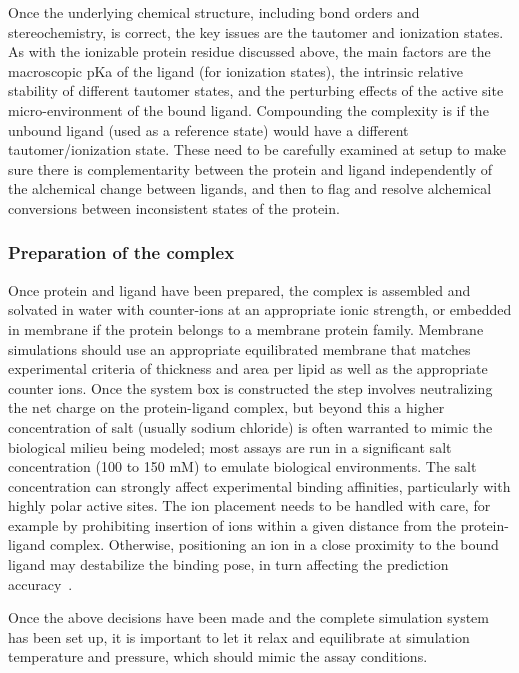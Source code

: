 \documentclass[9pt,bestpractices,pubversion]{livecoms}
\begin{document}
Once the underlying chemical structure, including bond orders and stereochemistry, is correct, the key issues are the  tautomer and ionization states. As with the ionizable protein residue discussed above, the main factors are the macroscopic pKa of the ligand (for ionization states), the intrinsic relative stability of different tautomer states, and the perturbing effects of the active site micro-environment of the bound ligand. Compounding the complexity is if the unbound ligand (used as a reference state) would have a different tautomer/ionization state. These need to be carefully examined at setup to make sure there is complementarity between the protein and ligand independently of the alchemical change between ligands, and then to flag and resolve alchemical conversions between inconsistent states of the protein.

\subsubsection{Preparation of the complex}

Once protein and ligand have been prepared, the complex is assembled and solvated in water with counter-ions at an appropriate ionic strength, or embedded in membrane if the protein belongs to a membrane protein family. Membrane simulations should use an appropriate equilibrated membrane that matches experimental criteria of thickness and area per lipid as well as the appropriate counter ions. Once the system box is constructed the step involves neutralizing the net charge on the protein-ligand complex, but beyond this a higher concentration of salt (usually sodium chloride) is often warranted to mimic the biological milieu being modeled; most assays are run in a significant salt concentration (100 to 150 mM) to emulate biological environments. The salt concentration can strongly affect experimental binding affinities, particularly with highly polar active sites. The ion placement needs to be handled with care, for example by prohibiting insertion of ions within a given distance from the protein-ligand complex. Otherwise, positioning an ion in a close proximity to the bound ligand may destabilize the binding pose, in turn affecting the prediction accuracy~\cite{aldeghi2018resistance}. 

Once the above decisions have been made and the complete simulation system has been set up, it is important to let it relax and equilibrate at simulation temperature and pressure, which should mimic the assay conditions.
\end{document}
